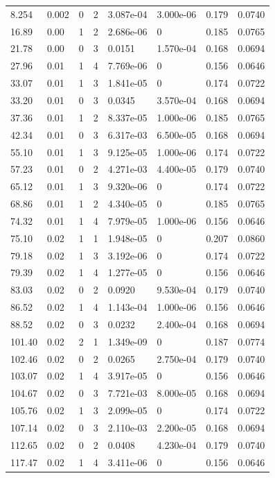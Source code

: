 \documentclass[preview]{standalone}
\begin{document}
{{\begin{tabular}{L{1.2cm}C{1.2cm} C{0.3cm}C{0.5cm} C{1.4cm}C{1.4cm} C{1.4cm}C{1.4cm}}
  8.254  &  0.002  & 0     &  2 &  3.087e-04  & 3.000e-06  & 0.179 &  0.0740   \\ 
  16.89  &  0.00  & 1     &  2 &  2.686e-06  & 0  & 0.185 &  0.0765   \\ 
  21.78  &  0.00  & 0     &  3 &  0.0151  & 1.570e-04  & 0.168 &  0.0694   \\ 
  27.96  &  0.01  & 1     &  4 &  7.769e-06  & 0  & 0.156 &  0.0646   \\ 
  33.07  &  0.01  & 1     &  3 &  1.841e-05  & 0  & 0.174 &  0.0722   \\ 
  33.20  &  0.01  & 0     &  3 &  0.0345  & 3.570e-04  & 0.168 &  0.0694   \\ 
  37.36  &  0.01  & 1     &  2 &  8.337e-05  & 1.000e-06  & 0.185 &  0.0765   \\ 
  42.34  &  0.01  & 0     &  3 &  6.317e-03  & 6.500e-05  & 0.168 &  0.0694   \\ 
  55.10  &  0.01  & 1     &  3 &  9.125e-05  & 1.000e-06  & 0.174 &  0.0722   \\ 
  57.23  &  0.01  & 0     &  2 &  4.271e-03  & 4.400e-05  & 0.179 &  0.0740   \\ 
  65.12  &  0.01  & 1     &  3 &  9.320e-06  & 0  & 0.174 &  0.0722   \\ 
  68.86  &  0.01  & 1     &  2 &  4.340e-05  & 0  & 0.185 &  0.0765   \\ 
  74.32  &  0.01  & 1     &  4 &  7.979e-05  & 1.000e-06  & 0.156 &  0.0646   \\ 
  75.10  &  0.02  & 1     &  1 &  1.948e-05  & 0  & 0.207 &  0.0860   \\ 
  79.18  &  0.02  & 1     &  3 &  3.192e-06  & 0  & 0.174 &  0.0722   \\ 
  79.39  &  0.02  & 1     &  4 &  1.277e-05  & 0  & 0.156 &  0.0646   \\ 
  83.03  &  0.02  & 0     &  2 &  0.0920  & 9.530e-04  & 0.179 &  0.0740   \\ 
  86.52  &  0.02  & 1     &  4 &  1.143e-04  & 1.000e-06  & 0.156 &  0.0646   \\ 
  88.52  &  0.02  & 0     &  3 &  0.0232  & 2.400e-04  & 0.168 &  0.0694   \\ 
  101.40  &  0.02  & 2     &  1 &  1.349e-09  & 0  & 0.187 &  0.0774   \\ 
  102.46  &  0.02  & 0     &  2 &  0.0265  & 2.750e-04  & 0.179 &  0.0740   \\ 
  103.07  &  0.02  & 1     &  4 &  3.917e-05  & 0  & 0.156 &  0.0646   \\ 
  104.67  &  0.02  & 0     &  3 &  7.721e-03  & 8.000e-05  & 0.168 &  0.0694   \\ 
  105.76  &  0.02  & 1     &  3 &  2.099e-05  & 0  & 0.174 &  0.0722   \\ 
  107.14  &  0.02  & 0     &  3 &  2.110e-03  & 2.200e-05  & 0.168 &  0.0694   \\ 
  112.65  &  0.02  & 0     &  2 &  0.0408  & 4.230e-04  & 0.179 &  0.0740   \\ 
  117.47  &  0.02  & 1     &  4 &  3.411e-06  & 0  & 0.156 &  0.0646   \\ 
\hline 
\end{tabular} 

}}
\end{document}
